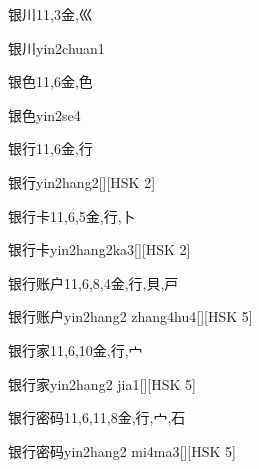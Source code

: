 \begin{Entry}{银川}{11,3}{⾦,⼮}
  \begin{Phonetics}{银川}{yin2chuan1}
  \end{Phonetics}
\end{Entry}

\begin{Entry}{银色}{11,6}{⾦,⾊}
  \begin{Phonetics}{银色}{yin2se4}
  \end{Phonetics}
\end{Entry}

\begin{Entry}{银行}{11,6}{⾦,⾏}
  \begin{Phonetics}{银行}{yin2hang2}[][HSK 2]
  \end{Phonetics}
\end{Entry}

\begin{Entry}{银行卡}{11,6,5}{⾦,⾏,⼘}
  \begin{Phonetics}{银行卡}{yin2hang2ka3}[][HSK 2]
  \end{Phonetics}
\end{Entry}

\begin{Entry}{银行账户}{11,6,8,4}{⾦,⾏,⾙,⼾}
  \begin{Phonetics}{银行账户}{yin2hang2 zhang4hu4}[][HSK 5]
  \end{Phonetics}
\end{Entry}

\begin{Entry}{银行家}{11,6,10}{⾦,⾏,⼧}
  \begin{Phonetics}{银行家}{yin2hang2 jia1}[][HSK 5]
  \end{Phonetics}
\end{Entry}

\begin{Entry}{银行密码}{11,6,11,8}{⾦,⾏,⼧,⽯}
  \begin{Phonetics}{银行密码}{yin2hang2 mi4ma3}[][HSK 5]
  \end{Phonetics}
\end{Entry}

